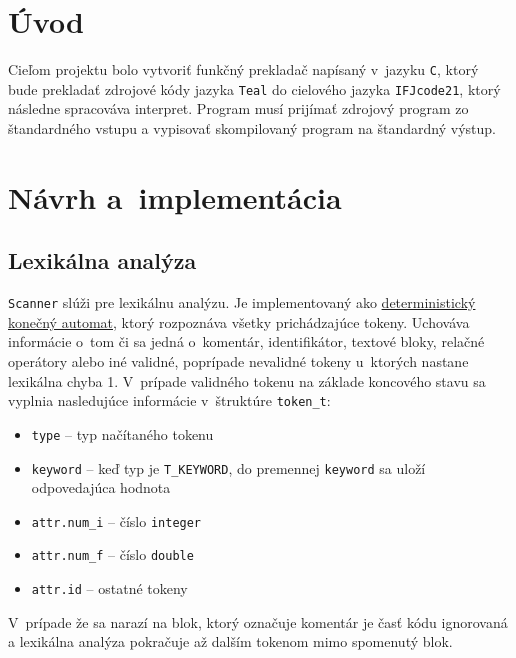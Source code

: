 \documentclass[a4paper, 11pt]{article}
\begin{document}
    \setcounter{page}{1}

    \section{Úvod}
    Cieľom projektu bolo vytvoriť funkčný prekladač napísaný v~jazyku \texttt{C}, ktorý bude prekladať zdrojové kódy jazyka
    \texttt{Teal} do cielového jazyka \texttt{IFJcode21}, ktorý následne spracováva interpret.
    Program musí prijímať zdrojový program zo štandardného vstupu a vypisovať skompilovaný program na štandardný výstup.




    \section{Návrh a~implementácia}

    \subsection{Lexikálna analýza}
    \texttt{Scanner} slúži pre lexikálnu analýzu. Je implementovaný ako \hyperref[sec: automat]{deterministický konečný automat}, ktorý rozpoznáva všetky
    prichádzajúce tokeny. Uchováva informácie o~tom či sa jedná o~komentár, identifikátor, textové bloky, relačné
    operátory alebo iné validné, poprípade nevalidné tokeny u~ktorých nastane lexikálna chyba 1. V~prípade validného
    tokenu na základe koncového stavu sa vyplnia nasledujúce informácie v~štruktúre \texttt{token\_t}:
    \begin{itemize}
        \item \texttt{type}  --  typ načítaného tokenu
        \item \texttt{keyword} -- keď typ je \texttt{T\_KEYWORD}, do premennej \texttt{keyword} sa uloží odpovedajúca hodnota
        \item \texttt{attr.num\_i} -- číslo \texttt{integer}
        \item \texttt{attr.num\_f} -- číslo \texttt{double}
        \item \texttt{attr.id} -- ostatné tokeny
    \end{itemize}
    V~prípade že sa narazí na blok, ktorý označuje komentár je časť kódu ignorovaná a lexikálna analýza pokračuje
    až dalším tokenom mimo spomenutý blok.
\end{document}

